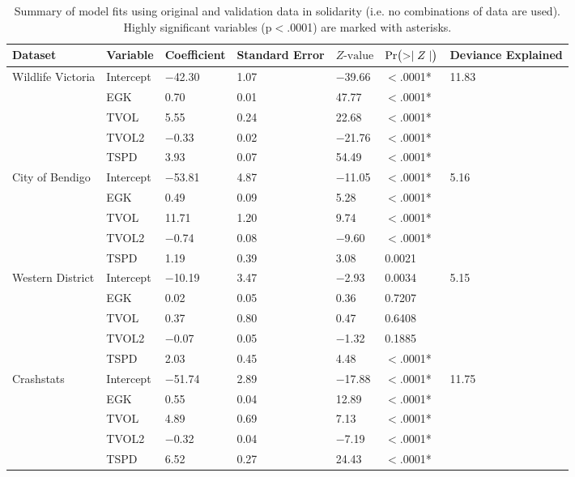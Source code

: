 \begin{table}[!t]
\caption[Summary of model fits using original and validation data]{Summary of model fits using original and validation data in solidarity (i.e. no combinations of data are used). Highly significant variables (p$<$.0001) are marked with asterisks.}
\centering
\begin{tabularx}{0.9\textwidth}{lllllll} \toprule
Dataset & Variable & Coefficient & Standard Error & $Z\text{-value}$ & $\text{Pr}\bigl( >\mid Z \mid \bigr)$ & Deviance Explained \\ 
  \midrule
Wildlife Victoria & Intercept & $-$42.30 & 1.07 & $-$39.66 & $<$.0001* & 11.83 \\ 
   & EGK & 0.70 & 0.01 & 47.77 & $<$.0001* &  \\ 
   & TVOL & 5.55 & 0.24 & 22.68 & $<$.0001* &  \\ 
   & TVOL2 & $-$0.33 & 0.02 & $-$21.76 & $<$.0001* &  \\ 
   & TSPD & 3.93 & 0.07 & 54.49 & $<$.0001* &  \\ 
  City of Bendigo & Intercept & $-$53.81 & 4.87 & $-$11.05 & $<$.0001* & 5.16 \\ 
   & EGK & 0.49 & 0.09 & 5.28 & $<$.0001* &  \\ 
   & TVOL & 11.71 & 1.20 & 9.74 & $<$.0001* &  \\ 
   & TVOL2 & $-$0.74 & 0.08 & $-$9.60 & $<$.0001* &  \\ 
   & TSPD & 1.19 & 0.39 & 3.08 & 0.0021 &  \\ 
  Western District & Intercept & $-$10.19 & 3.47 & $-$2.93 & 0.0034 & 5.15 \\ 
   & EGK & 0.02 & 0.05 & 0.36 & 0.7207 &  \\ 
   & TVOL & 0.37 & 0.80 & 0.47 & 0.6408 &  \\ 
   & TVOL2 & $-$0.07 & 0.05 & $-$1.32 & 0.1885 &  \\ 
   & TSPD & 2.03 & 0.45 & 4.48 & $<$.0001* &  \\ 
  Crashstats & Intercept & $-$51.74 & 2.89 & $-$17.88 & $<$.0001* & 11.75 \\ 
   & EGK & 0.55 & 0.04 & 12.89 & $<$.0001* &  \\ 
   & TVOL & 4.89 & 0.69 & 7.13 & $<$.0001* &  \\ 
   & TVOL2 & $-$0.32 & 0.04 & $-$7.19 & $<$.0001* &  \\ 
   & TSPD & 6.52 & 0.27 & 24.43 & $<$.0001* &  \\ 
\bottomrule
\end{tabularx}
\label{val_glm_perf}
\end{table}

